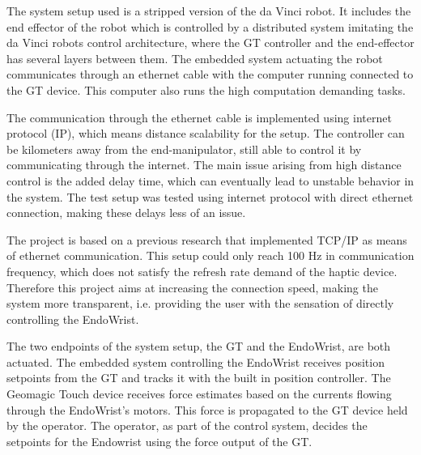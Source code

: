 The system setup used is a stripped version of the da Vinci robot. It includes the end effector of the robot which is controlled by a distributed system imitating the da Vinci robots control architecture, where the GT controller and the end-effector has several layers between them. The embedded system actuating the robot communicates through an ethernet cable with the computer running connected to the GT device. This computer also runs the high computation demanding tasks.

The communication through the ethernet cable is implemented using internet protocol (IP), which means distance scalability for the setup. The controller can be kilometers away from the end-manipulator, still able to control it by communicating through the internet. The main issue arising from high distance control is the added delay time, which can eventually lead to unstable behavior in the system. The test setup was tested using internet protocol with direct ethernet connection, making these delays less of an issue.

The project is based on a previous research that implemented TCP/IP as means of ethernet communication. This setup could only reach 100 Hz in communication frequency, which does not satisfy the refresh rate demand of the haptic device. Therefore this project aims at increasing the connection speed, making the system more transparent, i.e. providing the user with the sensation of directly controlling the EndoWrist.

The two endpoints of the system setup, the GT and the EndoWrist, are both actuated. The embedded system controlling the EndoWrist receives position setpoints from the GT and tracks it with the built in position controller.
The Geomagic Touch device receives force estimates based on the currents flowing through the EndoWrist's motors. This force is propagated to the GT device held by the operator. The operator, as part of the control system, decides the setpoints for the Endowrist using the force output of the GT. %



%